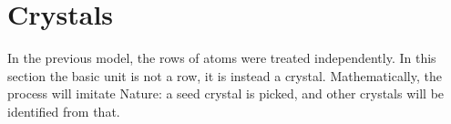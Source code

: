 \chapter{Crystals}

In the previous model, the rows of atoms were treated independently. In this section the basic unit is not a row, it is instead a crystal. Mathematically, the process will imitate Nature: a seed crystal is picked, and other crystals will be identified from that.

\endinput